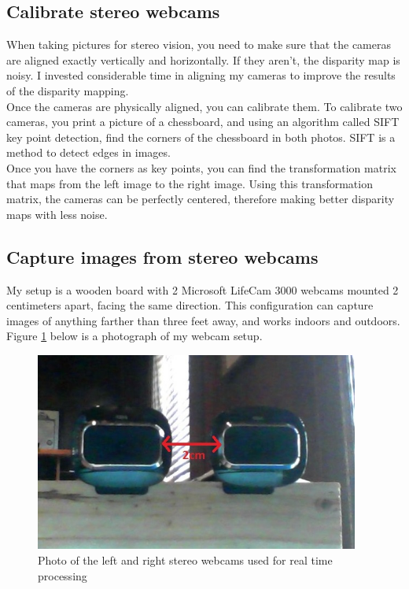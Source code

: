 \documentclass[11pt,fleqn]{article}
\begin{document}
\subsection{Calibrate stereo webcams}
When taking pictures for stereo vision, you need to make sure that the cameras are aligned exactly vertically and horizontally. If they aren't, the disparity map is noisy. I invested considerable time in aligning my cameras to improve the results of the disparity mapping.\\[5pt]
%
Once the cameras are physically aligned, you can calibrate them. To calibrate two cameras, you print a picture of a chessboard, and using an algorithm called SIFT key point detection, find the corners of the chessboard in both photos. SIFT is a method to detect edges in images. \\[5pt]
%
Once you have the corners as key points, you can find the transformation matrix that maps from the left image to the right image. Using this transformation matrix, the cameras can be perfectly centered, therefore making better disparity maps with less noise.

\subsection{Capture images from stereo webcams}
My setup is a wooden board with 2 Microsoft LifeCam 3000 webcams mounted 2 centimeters apart, facing the same direction. This configuration can capture images of anything farther than three feet away, and works indoors and outdoors. Figure \ref{fig:cam} below is a photograph of my webcam setup.\\

\begin{figure}[!h]
\begin{mdframed}
\centering
\includegraphics[width=0.95\textwidth, trim=30 50 45 50, clip]{images/setup.jpg}
\caption[Photo of the stereo webcams used for real time processing]{Photo of the left and right stereo webcams used for real time processing}
\label{fig:cam}
\end{mdframed}
\end{figure}
\end{document}
